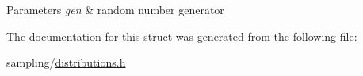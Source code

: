 \begin{DoxyParams}{\-Parameters}
{\em gen} & random number generator \\
\hline
\end{DoxyParams}


\-The documentation for this struct was generated from the following file\-:\begin{DoxyCompactItemize}
\item 
sampling/\hyperlink{distributions_8h}{distributions.\-h}\end{DoxyCompactItemize}
